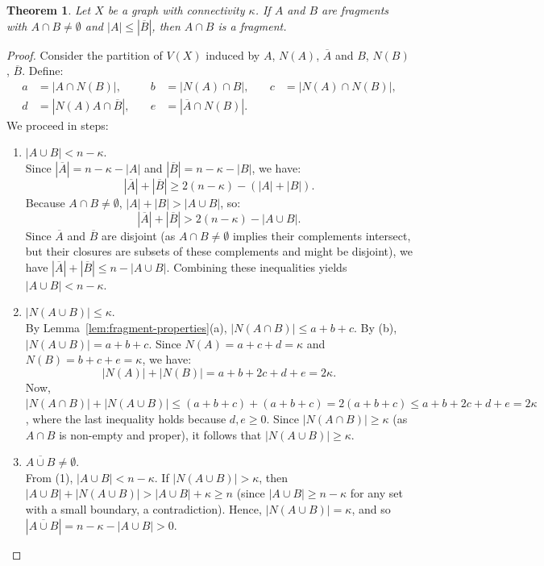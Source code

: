 \documentclass[12pt,a4paper,openany]{book}
\newtheorem{theorem}{Theorem}[section]
\begin{document}
\begin{theorem}\label{thm:intersection-fragment}
Let $X$ be a graph with connectivity $\kappa$. If $A$ and $B$ are fragments with $A \cap B \neq \emptyset$ and $|A| \leq |\overline{B}|$, then $A \cap B$ is a fragment.
\end{theorem}
\begin{proof}
Consider the partition of $V(X)$ induced by $A$, $N(A)$, $\overline{A}$ and $B$, $N(B)$, $\overline{B}$. Define:
\begin{align*}
a &= |A \cap N(B)|, \quad &b &= |N(A) \cap B|, \quad &c &= |N(A) \cap N(B)|, \\
d &= |N(A)A \cap \overline{B}|, \quad &e &= |\overline{A} \cap N(B)|.
\end{align*}
We proceed in steps:
\begin{enumerate}
    \item[(1)] $|A \cup B| < n - \kappa$. \\
    Since $|\overline{A}| = n - \kappa - |A|$ and $|\overline{B}| = n - \kappa - |B|$, we have:
    \[
    |\overline{A}| + |\overline{B}| \geq 2(n - \kappa) - (|A| + |B|).
    \]
    Because $A \cap B \neq \emptyset$, $|A| + |B| > |A \cup B|$, so:
    \[
    |\overline{A}| + |\overline{B}| > 2(n - \kappa) - |A \cup B|.
    \]
    Since $\overline{A}$ and $\overline{B}$ are disjoint (as $A \cap B \neq \emptyset$ implies their complements intersect, but their closures are subsets of these complements and might be disjoint), we have $|\overline{A}| + |\overline{B}| \leq n - |A \cup B|$. Combining these inequalities yields $|A \cup B| < n - \kappa$.

    \item[(2)] $|N(A \cup B)| \leq \kappa$. \\
    By Lemma~\ref{lem:fragment-properties}(a), $|N(A \cap B)| \leq a + b + c$. By (b), $|N(A \cup B)| = a + b + c$. Since $N(A) = a + c + d = \kappa$ and $N(B) = b + c + e = \kappa$, we have:
    \[
    |N(A)| + |N(B)| = a + b + 2c + d + e = 2\kappa.
    \]
    Now, $|N(A \cap B)| + |N(A \cup B)| \leq (a + b + c) + (a + b + c) = 2(a + b + c) \leq a + b + 2c + d + e = 2\kappa$, where the last inequality holds because $d, e \geq 0$. Since $|N(A \cap B)| \geq \kappa$ (as $A \cap B$ is non-empty and proper), it follows that $|N(A \cup B)| \geq \kappa$.

    \item[(3)] $\overline{A \cup B} \neq \emptyset$. \\
    From (1), $|A \cup B| < n - \kappa$. If $|N(A \cup B)| > \kappa$, then $|A \cup B| + |N(A \cup B)| > |A \cup B| + \kappa \geq n$ (since $|A \cup B| \geq n - \kappa$ for any set with a small boundary, a contradiction). Hence, $|N(A \cup B)| = \kappa$, and so $|\overline{A \cup B}| = n - \kappa - |A \cup B| > 0$.


\end{enumerate}
\end{proof}
\end{document}
